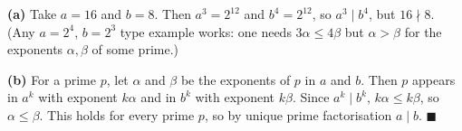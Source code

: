 \textbf{(a)} Take $a=16$ and $b=8$. Then $a^3=2^{12}$ and $b^4=2^{12}$, so $a^3\mid b^4$, but $16\nmid 8$. (Any $a=2^4$, $b=2^3$ type example works: one needs $3\alpha\le4\beta$ but $\alpha>\beta$ for the exponents $\alpha,\beta$ of some prime.)

\textbf{(b)} For a prime $p$, let $\alpha$ and $\beta$ be the exponents of $p$ in $a$ and $b$. Then $p$ appears in $a^k$ with exponent $k\alpha$ and in $b^k$ with exponent $k\beta$. Since $a^k\mid b^k$, $k\alpha\le k\beta$, so $\alpha\le\beta$. This holds for every prime $p$, so by unique prime factorisation $a\mid b$. $\blacksquare$
